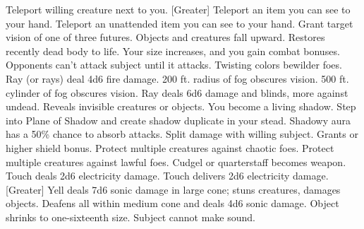     {Teleport willing creature next to you.}
[Greater]
    {Teleport an item you can see to your hand.}
    {Teleport an unattended item you can see to your hand.}
    {Grant target vision of one of three futures.}
    {Objects and creatures fall upward.}
    {Restores recently dead body to life.}
    {Your size increases, and you gain combat bonuses.}
    {Opponents can't attack subject until it attacks.}
    {Twisting colors bewilder foes.}
    {Ray (or rays) deal 4d6 fire damage.}
    {200 ft. radius of fog obscures vision.}
    {500 ft. cylinder of fog obscures vision.}
    {Ray deals 6d6 damage and blinds, more against undead.}
    {Reveals invisible creatures or objects.}
    {You become a living shadow.}
    {Step into Plane of Shadow and create shadow duplicate in your stead.}
    {Shadowy aura has a 50\% chance to absorb attacks. }
    {Split damage with willing subject.}
    {Grants  or higher shield bonus.}
    {Protect multiple creatures against chaotic foes. }
    {Protect multiple creatures against lawful foes.}
    {Cudgel or quarterstaff becomes  weapon.}
    {Touch deals 2d6 electricity damage.}
    {Touch delivers 2d6 electricity damage.}
[Greater]
    {Yell deals 7d6 sonic damage in large cone; stuns creatures, damages objects.}
    {Deafens all within medium cone and deals 4d6 sonic damage.}
    {Object shrinks to one-sixteenth size.}
    {Subject cannot make sound.}
